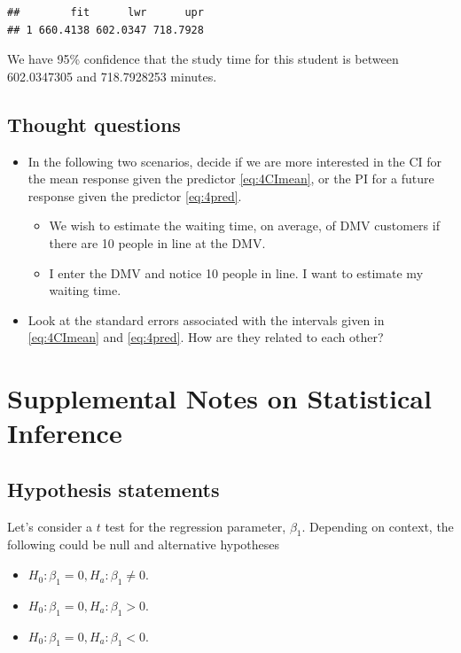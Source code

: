 \documentclass[
]{book}
\providecommand{\tightlist}{%
  \setlength{\itemsep}{0pt}\setlength{\parskip}{0pt}}
\begin{document}
\begin{verbatim}
##        fit      lwr      upr
## 1 660.4138 602.0347 718.7928
\end{verbatim}

We have 95\% confidence that the study time for this student is between 602.0347305 and 718.7928253 minutes.

\hypertarget{thought-questions-1}{%
\subsection{Thought questions}\label{thought-questions-1}}

\begin{itemize}
\item
  In the following two scenarios, decide if we are more interested in the CI for the mean response given the predictor \eqref{eq:4CImean}, or the PI for a future response given the predictor \eqref{eq:4pred}.

  \begin{itemize}
  \item
    We wish to estimate the waiting time, on average, of DMV customers if there are 10 people in line at the DMV.
  \item
    I enter the DMV and notice 10 people in line. I want to estimate my waiting time.
  \end{itemize}
\item
  Look at the standard errors associated with the intervals given in \eqref{eq:4CImean} and \eqref{eq:4pred}. How are they related to each other?
\end{itemize}

\hypertarget{supplemental-notes-on-statistical-inference}{%
\section{Supplemental Notes on Statistical Inference}\label{supplemental-notes-on-statistical-inference}}

\hypertarget{hypothesis-statements}{%
\subsection{Hypothesis statements}\label{hypothesis-statements}}

Let's consider a \(t\) test for the regression parameter, \(\beta_1\). Depending on context, the following could be null and alternative hypotheses

\begin{itemize}
\tightlist
\item
  \(H_0: \beta_1 = 0, H_a: \beta_1 \neq 0\).
\item
  \(H_0: \beta_1 = 0, H_a: \beta_1 > 0\).
\item
  \(H_0: \beta_1 = 0, H_a: \beta_1 < 0\).
\end{itemize}
\end{document}
